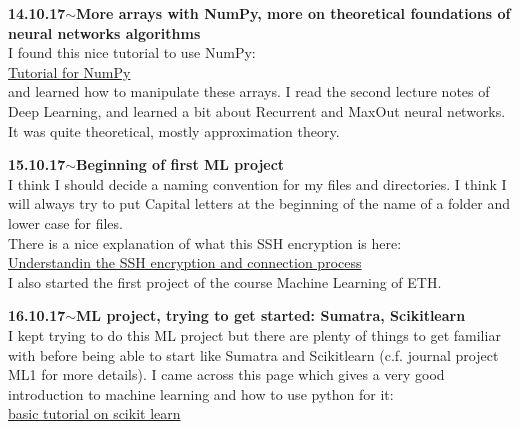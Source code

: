 \documentclass[11pt,a4paper]{article}
\newenvironment{loggentry}[2]%
{\noindent\textbf{#1}\hspace{1cm}$\mathbf{\sim}$\text{ }\textbf{#2}\\}{\vspace{0.5cm}}
\begin{document}
\begin{loggentry}{14.10.17}{More arrays with NumPy, more on theoretical foundations of neural networks algorithms}
I found this nice tutorial to use NumPy:\\
\href{https://docs.scipy.org/doc/numpy-dev/user/quickstart.html}{Tutorial for NumPy}\\
and learned how to manipulate these arrays. I read the second lecture notes of Deep Learning, and learned a bit about Recurrent and MaxOut neural networks. It was quite theoretical, mostly approximation theory.
\end{loggentry}

\begin{loggentry}{15.10.17}{Beginning of first ML project}
I think I should decide a naming convention for my files and directories. I think I will always try to put Capital letters at the beginning of the name of a folder and lower case for files.\\
There is a nice explanation of what this SSH encryption is here:\\
\href{https://www.digitalocean.com/community/tutorials/understanding-the-ssh-encryption-and-connection-process}{Understandin the SSH encryption and connection process}\\
I also started the first project of the course Machine Learning of ETH.\\
\end{loggentry}

\begin{loggentry}{16.10.17}{ML project, trying to get started:  Sumatra, Scikitlearn}
I kept trying to do this ML project but there are plenty of things to get familiar with before being able to start like Sumatra and Scikitlearn (c.f. journal project ML1 for more details). I came across this page which gives a very good introduction to machine learning and how to use python for it:\\
\href{http://scikit-learn.org/stable/tutorial/basic/tutorial.html}{basic tutorial on scikit learn}\\
\end{loggentry}
\end{document}
